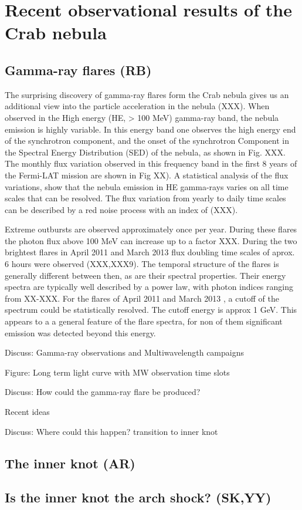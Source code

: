 \section{Recent observational results of the Crab nebula}
\subsection{Gamma-ray flares (RB)}

The surprising discovery of gamma-ray flares form the Crab nebula gives us an additional view into the particle acceleration in the nebula (XXX). When observed in the High energy (HE, > 100 MeV) gamma-ray band, the nebula emission is highly variable. In this energy band one observes the high energy end of the synchrotron component, and the onset of the synchrotron Component in the Spectral Energy Distribution (SED) of the nebula, as shown in Fig. XXX. The monthly flux variation observed in this frequency band in the first 8 years of the Fermi-LAT mission are shown in Fig XX). A statistical analysis of the flux variations, show that the nebula emission in HE gamma-rays varies on all time scales that can be resolved. The flux variation from yearly to daily time scales can be described by a red noise process with an index of (XXX).

Extreme outbursts are observed approximately once per year. During these flares the photon flux above 100 MeV can increase up to a factor XXX. During the two brightest flares in April 2011 and March 2013 flux doubling time scales of aprox. 6 hours were observed (XXX,XXX9). The temporal structure of the flares is generally different between then, as are their spectral properties. Their energy spectra are typically well described by a power law, with photon indices ranging from XX-XXX. For the flares of April 2011 and March 2013 , a cutoff of the spectrum could be statistically resolved. The cutoff energy is approx 1 GeV. This appears to a a general feature of the flare spectra, for non of them significant emission was detected beyond this energy.



Discuss: Gamma-ray observations and Multiwavelength campaigns

Figure: Long term light curve with MW observation time slots

Discuss: How could the gamma-ray flare be produced?

Recent ideas  \cite{2016arXiv160403179Y}\cite{2015arXiv151205426Z}\cite{2016arXiv160304850N}\cite{2016arXiv160305731L}

Discuss: Where could this happen? transition to inner knot

\subsection{The inner knot   (AR)}
\subsection{Is the inner knot the arch shock?                                      (SK,YY)}
